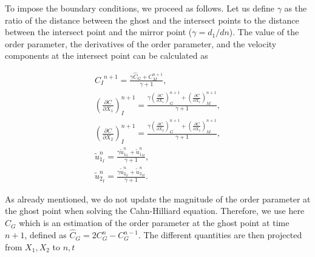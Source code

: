 \documentclass[review]{elsarticle}
\begin{document}
To impose the boundary conditions, we proceed as follows. Let us define $\gamma$ as the ratio of the distance between the ghost and the intersect points to the distance between the intersect point and the mirror point ($\gamma= d_1/dn$). The value of the order parameter, the derivatives of the order parameter, and the velocity components at the intersect point can be calculated as
\begin{linenomath}\begin{equation} \label{interpolationAtWall}
\begin{gathered}
{C_I}^{n+1} = \frac{ \gamma \hat{C}_G +C^{n+1}_M}{\gamma+1 },\\
\left(\frac{\partial C}{ \partial X_1}\right)^{n+1}_I = \frac{\gamma \left(\frac{\partial C}{ \partial X_1}\right)^{n+1}_G +\left(\frac{\partial C}{ \partial X_1}\right)^{n+1}_M}{\gamma+1}, \\
\left(\frac{\partial C}{ \partial X_2}\right)^{n+1}_I = \frac{\gamma \left(\frac{\partial C}{ \partial X_2}\right)^{n+1}_G +\left(\frac{\partial C}{ \partial X_2}\right)_M^{n+1}}{\gamma+1}, \\
{\tilde{u}}^{n}_{1_I} = \frac{\gamma {\tilde{u}^{n}_{1_G} +\tilde{u}^{n}_{1_M}}}{\gamma+1}, \\
{\tilde{u}}^{n}_{2_I} = \frac{\gamma {\tilde{u}^{n}_{2_G} +\tilde{u}^{n}_{2_M}}}{\gamma+1}.
\end{gathered}
\end{equation}\end{linenomath}
As already mentioned, we do not update the magnitude of the order parameter at the ghost point when solving the Cahn-Hilliard equation. Therefore, we use here $\hat{C}_G$ which is an estimation of the order parameter at the ghost point at time $n+1$, defined as $\hat{C}_G= 2C^n_G-C^{n-1}_G$. The different quantities  are then projected from $X_1, X_2$ to $n, t$
\end{document}
